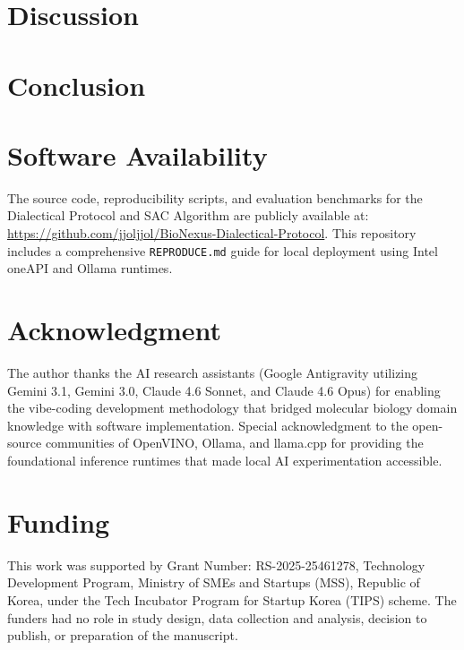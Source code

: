 \documentclass[journal]{IEEEtran}
\begin{document}
\section{Discussion}


\section{Conclusion}


\section{Software Availability}
The source code, reproducibility scripts, and evaluation benchmarks for the Dialectical Protocol and SAC Algorithm are publicly available at: \url{https://github.com/jjoljjol/BioNexus-Dialectical-Protocol}. This repository includes a comprehensive \texttt{REPRODUCE.md} guide for local deployment using Intel oneAPI and Ollama runtimes.

\section*{Acknowledgment}
The author thanks the AI research assistants (Google Antigravity utilizing Gemini 3.1, Gemini 3.0, Claude 4.6 Sonnet, and Claude 4.6 Opus) for enabling the vibe-coding development methodology that bridged molecular biology domain knowledge with software implementation. Special acknowledgment to the open-source communities of OpenVINO, Ollama, and llama.cpp for providing the foundational inference runtimes that made local AI experimentation accessible.

\section*{Funding}
This work was supported by Grant Number: RS-2025-25461278, Technology Development Program, Ministry of SMEs and Startups (MSS), Republic of Korea, under the Tech Incubator Program for Startup Korea (TIPS) scheme. The funders had no role in study design, data collection and analysis, decision to publish, or preparation of the manuscript.




\onecolumn

\end{document}

